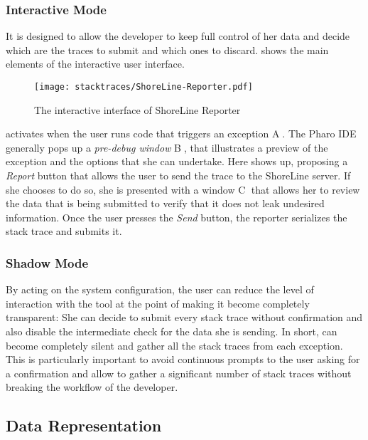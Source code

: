 \subsubsection{Interactive Mode}
It is designed to allow the developer to keep full control of her data and decide which are the traces to submit and which ones to discard.
 shows the main elements of the interactive user interface.

\begin{figure}[ht]
\begin{center}
  \texttt{[image: stacktraces/ShoreLine-Reporter.pdf]}
  \caption{The interactive interface of ShoreLine Reporter}
  \label{fig:shoreline-reporter}
\end{center}
\end{figure}

\shr activates when the user runs code that triggers an exception \textcircled{\scriptsize A}.
The Pharo IDE generally pops up a \emph{pre-debug window} \textcircled{\scriptsize B}, that illustrates a preview of the exception and the options that she can undertake.
Here \shr shows up, proposing a \emph{Report} button that allows the user to send the trace to the ShoreLine server.
If she chooses to do so, she is presented with a window \textcircled{\scriptsize C} that allows her to review the data that is being submitted to verify that it does not leak undesired information.
Once the user presses the \emph{Send} button, the reporter serializes the stack trace and submits it.

\subsubsection{Shadow Mode}
By acting on the system configuration, the user can reduce the level of interaction with the tool at the point of making it become completely transparent: She can decide to submit every stack trace without confirmation and also disable the intermediate check for the data she is sending.
In short, \shr can become completely silent and gather all the stack traces from each exception.
This is particularly important to avoid continuous prompts to the user asking for a confirmation and allow \shr to gather a significant number of stack traces without breaking the workflow of the developer.


\subsection{Data Representation}

